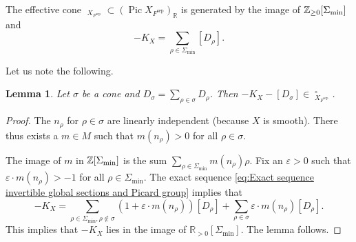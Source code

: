 \documentclass[a4paper,11pt,reqno]{amsart}
\newcommand{\R}{\mathbb{R}}
\DeclareMathOperator{\Pic}{Pic}
\DeclareMathOperator{\Eff}{\overline{Eff}}
\DeclareMathOperator{\sep}{sep}
\newtheorem{lemma}[theorem]{Lemma}
\theoremstyle{definition}
\begin{document}
The effective cone $\Eff_{X_{F^{\sep}}} \subset (\Pic X_{F^{\sep}})_{\R}$  is generated by the image of $\mathbb{Z}_{\geq 0}[\Sigma_{\min}]$ and
\begin{equation}\label{eq:anticanonical divisor of a toric variety}
	- K_X = \sum_{\rho \in \Sigma_{\min}} [D_{\rho}].
\end{equation}

Let us note the following.
\begin{lemma}\label{lem:log anticanonical divisor is big}
	Let $\sigma$ be a cone and $D_{\sigma} = \sum_{\rho \in \sigma} D_{\rho}$. Then $- K_X - [D_{\sigma}] \in \Eff_{X_{F^{\sep}}}^{\circ}$.
\end{lemma}
\begin{proof}
	The $n_{\rho}$ for $\rho \in \sigma$ are linearly independent (because $X$ is smooth). There thus exists a $m \in M$ such that $m(n_{\rho}) > 0$ for all $\rho \in \sigma$.
	
	The image of $m$ in $\mathbb{Z}[\Sigma_{\min}]$ is the sum $\sum_{\rho \in \Sigma_{\min}} m(n_{\rho})\rho$. Fix an $\varepsilon > 0$ such that $\varepsilon \cdot m(n_{\rho}) > -1$ for all $\rho \in \Sigma_{\min}$. The exact sequence \eqref{eq:Exact sequence invertible global sections and Picard group} implies that 
	\[
	- K_X = \sum_{\rho \in \Sigma_{\min}, \rho \not \in \sigma} (1 + \varepsilon \cdot m(n_\rho))[D_{\rho}] + \sum_{\rho \in \sigma} \varepsilon \cdot m(n_{\rho}) [D_{\rho}].
	\]
	This implies that $- K_X$ lies in the image of $\R_{> 0}[\Sigma_{\min}]$. The lemma follows. 
\end{proof}
\end{document}
